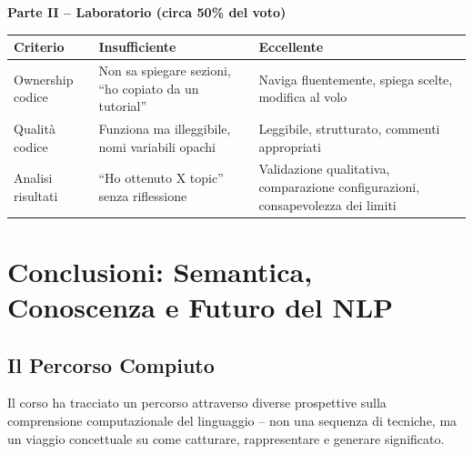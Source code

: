 \documentclass[12pt,a4paper]{article}
\begin{document}
\begin{resultbox}
\textbf{Parte II -- Laboratorio (circa 50\% del voto)}
\begin{center}
\small
\begin{tabular}{lL{4.9cm}L{4.9cm}}
\toprule
\textbf{Criterio} & \textbf{Insufficiente} & \textbf{Eccellente} \\
\midrule
Ownership codice & Non sa spiegare sezioni, ``ho copiato da un tutorial'' & Naviga fluentemente, spiega scelte, modifica al volo \\
Qualit\`a codice & Funziona ma illeggibile, nomi variabili opachi & Leggibile, strutturato, commenti appropriati \\
Analisi risultati & ``Ho ottenuto X topic'' senza riflessione & Validazione qualitativa, comparazione configurazioni, consapevolezza dei limiti \\
\bottomrule
\end{tabular}
\end{center}
\end{resultbox}

\section{Conclusioni: Semantica, Conoscenza e Futuro del NLP}

\subsection{Il Percorso Compiuto}

Il corso ha tracciato un percorso attraverso diverse prospettive sulla comprensione computazionale del linguaggio -- non una sequenza di tecniche, ma un viaggio concettuale su come catturare, rappresentare e generare significato.
\end{document}
